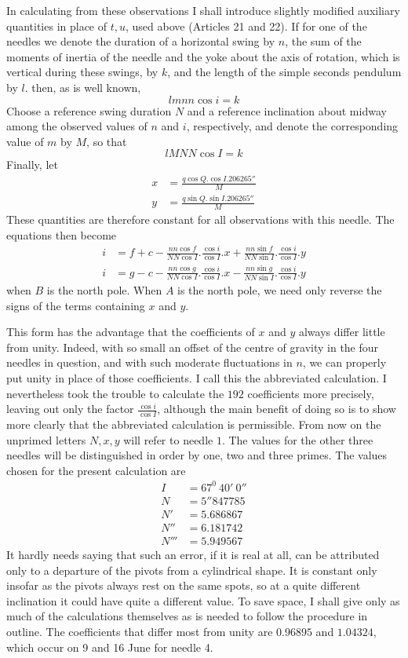 In calculating from these observations I shall introduce slightly modified auxiliary quantities in place of $t,u$, used above (Articles 21 and 22). If for one of the needles we denote the duration of a horizontal swing by $n$, the sum of the moments of inertia of the needle and the yoke about the axis of rotation, which is vertical during these swings, by $k$, and the length of the simple seconds pendulum by $l$. then, as is well known,
\[
lmnn\cos i=k
\]
Choose a reference swing duration $N$ and a reference inclination about midway among the observed values of $n$ and $i$, respectively, and denote the corresponding value of $m$ by $M$, so that
\[
lMNN\cos I=k
\]
Finally, let
\[
\begin{aligned}
x&=\frac{q\cos Q.\cos I.206265''}{M}\\
y&=\frac{q\sin Q.\sin I.206265''}{M}
\end{aligned}
\]
These quantities are therefore constant for all observations with this needle. The equations then become
\[
\begin{aligned}
i&=f+c-\frac{nn\cos f}{NN\cos I}.\frac{\cos i}{\cos I}.x+\frac{nn\sin f}{NN\sin I}.\frac{\cos i}{\cos I}.y\\
i&=g-c-\frac{nn\cos g}{NN\cos I}.\frac{\cos i}{\cos I}.x-\frac{nn\sin g}{NN\sin I}.\frac{\cos i}{\cos I}.y
\end{aligned}
\]
when $B$ is the north pole. When $A$ is the north pole, we need only reverse the signs of the terms containing $x$ and $y$.

This form has the advantage that the coefficients of $x$ and $y$ always differ little from unity. Indeed, with so small an offset of the centre of gravity in the four needles in question, and with such moderate fluctuations in $n$, we can properly put unity in place of those coefficients. I call this the abbreviated calculation. I nevertheless took the trouble to calculate the $192$ coefficients more precisely, leaving out only the factor $\frac{\cos i}{\cos I}$, although the main benefit of doing so is to show more clearly that the abbreviated calculation is permissible. From now on the unprimed letters $N,x,y$ will refer to needle $1$. The values for the other three needles will be distinguished in order by one, two and three primes. The values chosen for the present calculation are
\[
\begin{aligned}
I&=67^0\ 40'\ 0''\\
N&=5''847785\\
N'&=5.686867\\
N''&=6.181742\\
N'''&=5.949567
\end{aligned}
\]
\expandafter\def\csname HistoricalNoteText485\endcsname{It hardly needs saying that such an error, if it is real at all, can be attributed only to a departure of the pivots from a cylindrical shape. It is constant only insofar as the pivots always rest on the same spots, so at a quite different inclination it could have quite a different value.}
To save space, I shall give only as much of the calculations themselves as is needed to follow the procedure in outline. The coefficients that differ most from unity are $0.96895$ and $1.04324$, which occur on 9 and 16 June for needle 4.

